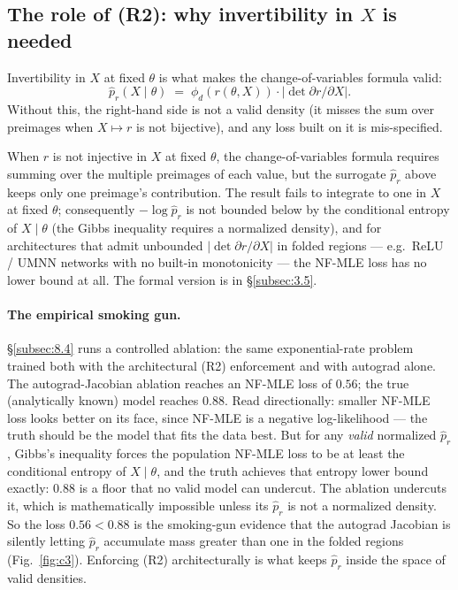 \documentclass[11pt]{article}
\begin{document}
\subsection{The role of (R2): why invertibility in \(X\) is needed}\label{subsec:2.4}

Invertibility in \(X\) at fixed \(\theta\) is what makes the
change-of-variables formula valid: \[
\hat p_r(X \mid \theta) \;=\; \phi_d(r(\theta, X)) \cdot \bigl|\det \partial r / \partial X\bigr|.
\] Without this, the right-hand side is not a valid density (it misses
the sum over preimages when \(X \mapsto r\) is not bijective), and any
loss built on it is mis-specified.

When \(r\) is not injective in \(X\) at fixed \(\theta\), the
change-of-variables formula requires summing over the multiple preimages
of each value, but the surrogate \(\hat p_r\) above keeps only one
preimage's contribution. The result fails to integrate to one in \(X\)
at fixed \(\theta\); consequently \(-\log \hat p_r\) is not bounded
below by the conditional entropy of \(X \mid \theta\) (the Gibbs
inequality requires a normalized density), and for architectures that
admit unbounded \(|\det \partial r / \partial X|\) in folded regions ---
e.g.\ ReLU / UMNN networks with no built-in monotonicity --- the NF-MLE
loss has no lower bound at all. The formal version is in
\S\ref{subsec:3.5}.

\paragraph{The empirical smoking gun.}
\S\ref{subsec:8.4} runs a controlled ablation: the same exponential-rate
problem trained both with the architectural (R2) enforcement and with
autograd alone. The autograd-Jacobian ablation reaches an NF-MLE loss
of \(0.56\); the true (analytically known) model reaches \(0.88\). Read
directionally: smaller NF-MLE loss looks better on its face, since
NF-MLE is a negative log-likelihood --- the truth should be the model
that fits the data best. But for any \emph{valid} normalized
\(\hat p_r\), Gibbs's inequality forces the population NF-MLE loss to be
at least the conditional entropy of \(X \mid \theta\), and the truth
achieves that entropy lower bound exactly: \(0.88\) is a floor that no
valid model can undercut. The ablation undercuts it, which is
mathematically impossible unless its \(\hat p_r\) is not a normalized
density. So the loss \(0.56 < 0.88\) is the smoking-gun evidence that
the autograd Jacobian is silently letting \(\hat p_r\) accumulate mass
greater than one in the folded regions (Fig.~\ref{fig:c3}). Enforcing (R2) architecturally
is what keeps \(\hat p_r\) inside the space of valid densities.
\end{document}
